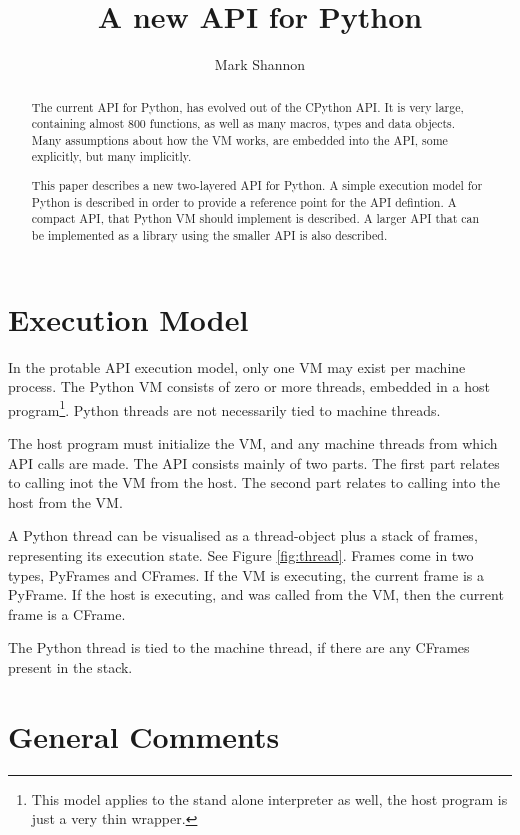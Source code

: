 \documentclass[a4paper,10pt]{article}
\title{A new API for Python}
\author{Mark Shannon}
\date{}
\begin{document}
\maketitle

\begin{abstract}

The current API for Python, has evolved out of the CPython API. 
It is very large, containing almost 800 functions, as well as many macros, types and data objects.
Many assumptions about how the VM works, are embedded into the API, some explicitly, but many implicitly.

This paper describes a new two-layered API for Python. 
A simple execution model for Python is described in order to provide a reference point for the API defintion.
A compact API, that Python VM should implement is described.
A larger API that can be implemented as a library using the smaller API is also described.

\end{abstract}

\section{Execution Model}

In the protable API execution model, only one VM may exist per machine process.
The Python VM consists of zero or more threads, 
embedded in a host program\footnote{This model applies to the stand alone interpreter as well,
the host program is just a very thin wrapper.}.
Python threads are not necessarily tied to machine threads.

The host program must initialize the VM, and any machine threads from which API calls are made.
The API consists mainly of two parts. The first part relates to calling inot the VM from the host.
The second part relates to calling into the host from the VM.

A Python thread can be visualised as a thread-object plus a stack of frames, representing its execution state.
See Figure \ref{fig:thread}.
Frames come in two types, PyFrames and CFrames. If the VM is executing, the current frame is a PyFrame. 
If the host is executing, and was called from the VM, then the current frame is a CFrame.

The Python thread is tied to the machine thread, if there are any CFrames present in the stack.

\section{General Comments}
\end{document}

